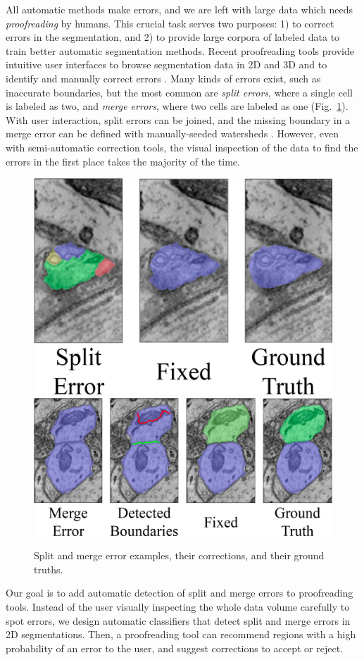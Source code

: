 All automatic methods make errors, and we are left with large data which needs \emph{proofreading} by humans. This crucial task serves two purposes: 1) to correct errors in the segmentation, and 2) to provide large corpora of labeled data to train better automatic segmentation methods. Recent proofreading tools provide intuitive user interfaces to browse segmentation data in 2D and 3D and to identify and manually correct errors \cite{markus_proofreading,raveler,mojo2,haehn_dojo_2014,karimov_guided_volume_editing,uzunbas}. Many kinds of errors exist, such as inaccurate boundaries, but the most common are \emph{split errors}, where a single cell is labeled as two, and \emph{merge errors}, where two cells are labeled as one (Fig.~\ref{fig:merge_error}). With user interaction, split errors can be joined, and the missing boundary in a merge error can be defined with manually-seeded watersheds \cite{haehn_dojo_2014}. However, even with semi-automatic correction tools, the visual inspection of the data to find the errors in the first place takes the majority of the time.

\begin{figure}[t]
\centering
\includegraphics[width=.35\textwidth]{gfx/spliterror_2.png}
\qquad
\includegraphics[width=.55\textwidth]{gfx/mergeerror.png}
\caption{Split and merge error examples, their corrections, and their ground truths.}
\label{fig:merge_error}
\end{figure}

Our goal is to add automatic detection of split and merge errors to proofreading tools. Instead of the user visually inspecting the whole data volume carefully to spot errors, we design automatic classifiers that detect split and merge errors in 2D segmentations. Then, a proofreading tool can recommend regions with a high probability of an error to the user, and suggest corrections to accept or reject.

